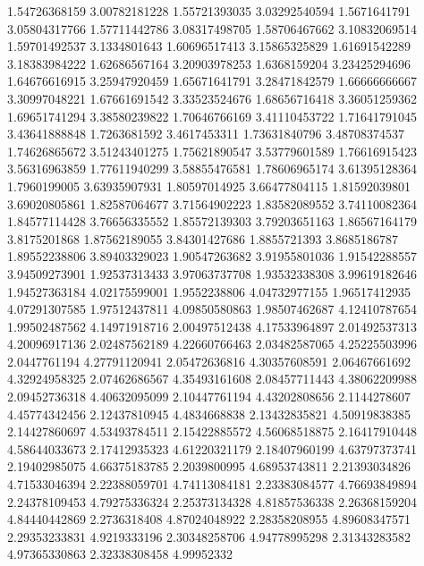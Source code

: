   1.54726368159    3.00782181228
  1.55721393035    3.03292540594
   1.5671641791    3.05804317766
  1.57711442786    3.08317498705
  1.58706467662    3.10832069514
  1.59701492537     3.1334801643
  1.60696517413    3.15865325829
  1.61691542289    3.18383984222
  1.62686567164    3.20903978253
   1.6368159204    3.23425294696
  1.64676616915    3.25947920459
  1.65671641791    3.28471842579
  1.66666666667    3.30997048221
  1.67661691542    3.33523524676
  1.68656716418    3.36051259362
  1.69651741294    3.38580239822
  1.70646766169    3.41110453722
  1.71641791045    3.43641888848
   1.7263681592     3.4617453311
  1.73631840796    3.48708374537
  1.74626865672    3.51243401275
  1.75621890547    3.53779601589
  1.76616915423    3.56316963859
  1.77611940299    3.58855476581
  1.78606965174    3.61395128364
   1.7960199005    3.63935907931
  1.80597014925    3.66477804115
  1.81592039801    3.69020805861
  1.82587064677    3.71564902223
  1.83582089552    3.74110082364
  1.84577114428    3.76656335552
  1.85572139303    3.79203651163
  1.86567164179     3.8175201868
  1.87562189055    3.84301427686
   1.8855721393     3.8685186787
  1.89552238806    3.89403329023
  1.90547263682    3.91955801036
  1.91542288557    3.94509273901
  1.92537313433    3.97063737708
  1.93532338308    3.99619182646
  1.94527363184    4.02175599001
   1.9552238806    4.04732977155
  1.96517412935    4.07291307585
  1.97512437811    4.09850580863
  1.98507462687    4.12410787654
  1.99502487562    4.14971918716
  2.00497512438    4.17533964897
  2.01492537313    4.20096917136
  2.02487562189    4.22660766463
  2.03482587065    4.25225503996
   2.0447761194    4.27791120941
  2.05472636816    4.30357608591
  2.06467661692    4.32924958325
  2.07462686567    4.35493161608
  2.08457711443    4.38062209988
  2.09452736318    4.40632095099
  2.10447761194    4.43202808656
   2.1144278607    4.45774342456
  2.12437810945     4.4834668838
  2.13432835821    4.50919838385
  2.14427860697    4.53493784511
  2.15422885572    4.56068518875
  2.16417910448    4.58644033673
  2.17412935323    4.61220321179
  2.18407960199    4.63797373741
  2.19402985075    4.66375183785
   2.2039800995    4.68953743811
  2.21393034826    4.71533046394
  2.22388059701    4.74113084181
  2.23383084577    4.76693849894
  2.24378109453    4.79275336324
  2.25373134328    4.81857536338
  2.26368159204    4.84440442869
   2.2736318408    4.87024048922
  2.28358208955    4.89608347571
  2.29353233831     4.9219333196
  2.30348258706    4.94778995298
  2.31343283582    4.97365330863
  2.32338308458       4.99952332
